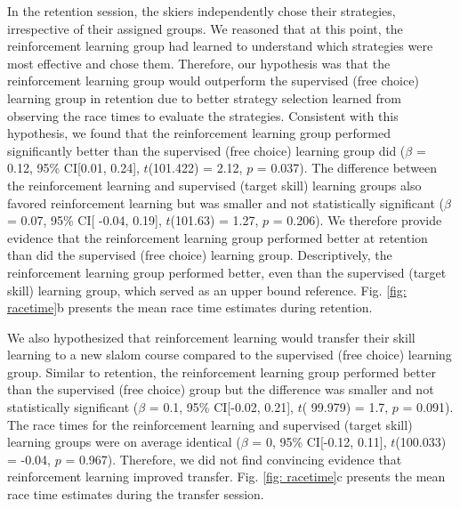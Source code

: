 In the retention session, the skiers independently chose their strategies, irrespective of their assigned groups. We reasoned that at this point, the reinforcement learning group had learned to understand which strategies were most effective and chose them. Therefore, our hypothesis was that the reinforcement learning group would outperform the supervised (free choice) learning group in retention due to better strategy selection learned from observing the race times to evaluate the strategies. Consistent with this hypothesis, we found that the reinforcement learning group performed significantly better than the supervised (free choice) learning group did ($\beta$ = 0.12, 95\% CI[0.01, 0.24], $t$(101.422) = 2.12, $p$ = 0.037). The difference between the reinforcement learning and supervised (target skill) learning groups also favored reinforcement learning but was smaller and not statistically significant  ($\beta$ = 0.07, 95\% CI[ -0.04, 0.19], $t$(101.63) = 1.27, $p$ = 0.206). We therefore provide evidence that the reinforcement learning group performed better at retention than did the supervised (free choice) learning group. Descriptively, the reinforcement learning group performed better, even than the supervised (target skill) learning group, which served as an upper bound reference. Fig. \ref{fig: racetime}b presents the mean race time estimates during retention. 

We also hypothesized that reinforcement learning would transfer their skill learning to a new slalom course compared to the supervised (free choice) learning group. Similar to retention, the reinforcement learning group performed better than the supervised (free choice) group but the difference was smaller and not statistically significant ($\beta$ = 0.1, 95\% CI[-0.02, 0.21], $t$( 99.979) = 1.7, $p$  = 0.091). The race times for the reinforcement learning and supervised (target skill) learning groups were on average identical ($\beta$ = 0, 95\% CI[-0.12, 0.11], $t$(100.033) = -0.04, $p$ = 0.967). Therefore, we did not find convincing evidence that reinforcement learning improved transfer. Fig. \ref{fig: racetime}c presents the mean race time estimates during the transfer session. 


